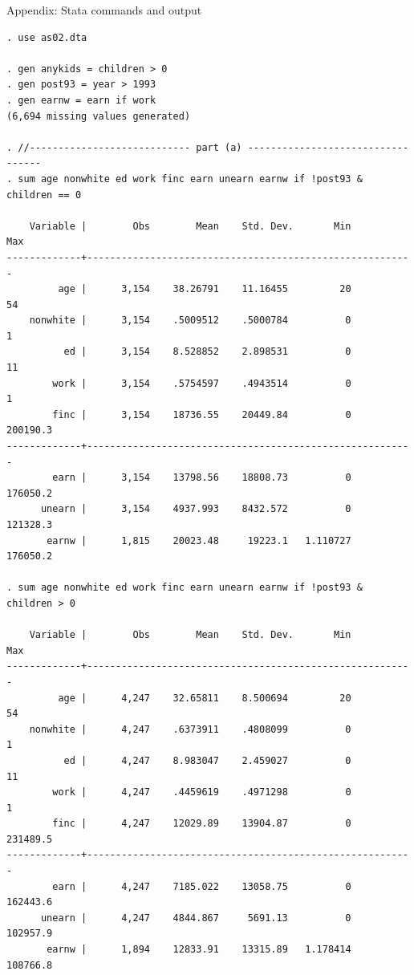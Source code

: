 \documentclass{article}
\newenvironment{changemargin}[2]{%
\begin{list}{}{%
\setlength{\topsep}{0pt}%
\setlength{\leftmargin}{#1}%
\setlength{\rightmargin}{#2}%
\setlength{\listparindent}{\parindent}%
\setlength{\itemindent}{\parindent}%
\setlength{\parsep}{\parskip}%
}%
\item[]}{\end{list}}
\begin{document}
\begin{changemargin}{-0.5in}{-0.5in} 

\subsection*{Appendix: Stata commands and output}

\begin{multicols}{2}

\begin{verbatim}
. use as02.dta                    

. gen anykids = children > 0
. gen post93 = year > 1993
. gen earnw = earn if work 
(6,694 missing values generated)

. //---------------------------- part (a) ----------------------------------
. sum age nonwhite ed work finc earn unearn earnw if !post93 & children == 0

    Variable |        Obs        Mean    Std. Dev.       Min        Max
-------------+---------------------------------------------------------
         age |      3,154    38.26791    11.16455         20         54
    nonwhite |      3,154    .5009512    .5000784          0          1
          ed |      3,154    8.528852    2.898531          0         11
        work |      3,154    .5754597    .4943514          0          1
        finc |      3,154    18736.55    20449.84          0   200190.3
-------------+---------------------------------------------------------
        earn |      3,154    13798.56    18808.73          0   176050.2
      unearn |      3,154    4937.993    8432.572          0   121328.3
       earnw |      1,815    20023.48     19223.1   1.110727   176050.2

. sum age nonwhite ed work finc earn unearn earnw if !post93 & children > 0

    Variable |        Obs        Mean    Std. Dev.       Min        Max
-------------+---------------------------------------------------------
         age |      4,247    32.65811    8.500694         20         54
    nonwhite |      4,247    .6373911    .4808099          0          1
          ed |      4,247    8.983047    2.459027          0         11
        work |      4,247    .4459619    .4971298          0          1
        finc |      4,247    12029.89    13904.87          0   231489.5
-------------+---------------------------------------------------------
        earn |      4,247    7185.022    13058.75          0   162443.6
      unearn |      4,247    4844.867     5691.13          0   102957.9
       earnw |      1,894    12833.91    13315.89   1.178414   108766.8


\end{verbatim}
\end{multicols}
\end{changemargin}
\end{document}
